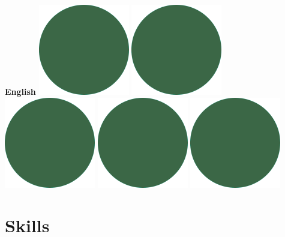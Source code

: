 \documentclass[]{commands}
\begin{document}
\begin{aside}
\textbf{English}\hfill
\includegraphics[scale=0.11]{img/IPSGreenDots.png}
\includegraphics[scale=0.11]{img/IPSGreenDots.png}
\includegraphics[scale=0.11]{img/IPSGreenDots.png}
\includegraphics[scale=0.11]{img/IPSGreenDots.png}
\includegraphics[scale=0.11]{img/IPSGreenDots.png}

\vspace{3.5mm}
\section{Skills}
\vspace{3.5mm}


\end{aside}
\end{document}
